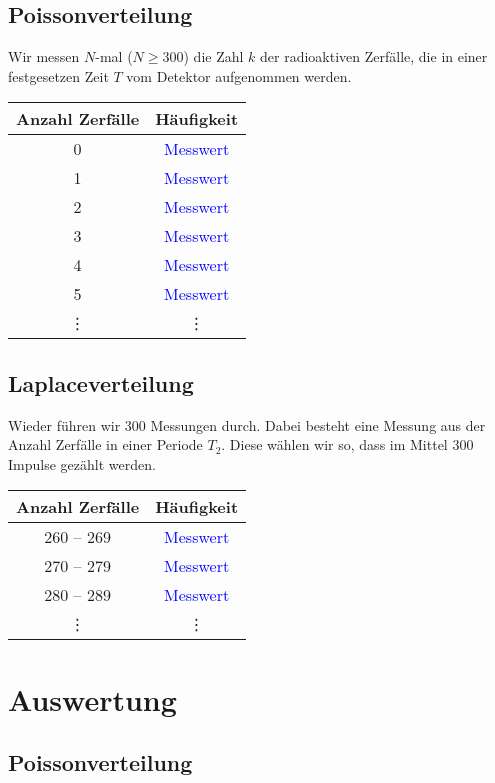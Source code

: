 \documentclass[11pt]{article}
\begin{document}
\subsection{Poissonverteilung}
\label{durchführung-poisson}

Wir messen $N$-mal ($N \geq 300$) die Zahl $k$ der radioaktiven Zerfälle, die in einer festgesetzen Zeit $T$ vom Detektor aufgenommen werden.

\begin{tabular}{cc}
	Anzahl Zerfälle & Häufigkeit \\
	\hline
	0 & \textcolor{blue}{Messwert} \\
	1 & \textcolor{blue}{Messwert} \\
	2 & \textcolor{blue}{Messwert} \\
	3 & \textcolor{blue}{Messwert} \\
	4 & \textcolor{blue}{Messwert} \\
	5 & \textcolor{blue}{Messwert} \\
		 \vdots & \vdots \\
\end{tabular}

\subsection{Laplaceverteilung}
\label{durchführung-laplace}

Wieder führen wir 300 Messungen durch. Dabei besteht eine Messung aus der
Anzahl Zerfälle in einer Periode $T_2$. Diese wählen wir so, dass im Mittel 300
Impulse gezählt werden.

\begin{tabular}{cc}
	Anzahl Zerfälle & Häufigkeit \\
	\hline
	260 – 269 & \textcolor{blue}{Messwert} \\
	270 – 279 & \textcolor{blue}{Messwert} \\
	280 – 289 & \textcolor{blue}{Messwert} \\
	   \vdots & \vdots
\end{tabular}

\section{Auswertung}

\subsection{Poissonverteilung}
\end{document}
